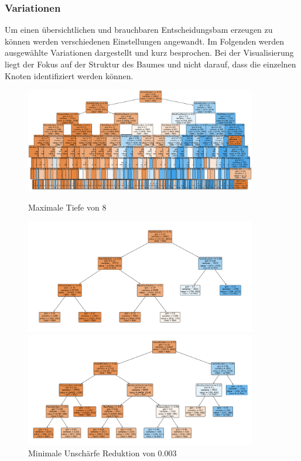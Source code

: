 \subsubsection{Variationen}
Um einen übersichtlichen und brauchbaren Entscheidungsbam erzeugen zu können werden verschiedenen Einstellungen angewandt. Im Folgenden werden ausgewählte Variationen dargestellt und kurz besprochen. Bei der Visualisierung liegt der Fokus auf der Struktur des Baumes und nicht darauf, dass die einzelnen Knoten identifiziert werden können.\\
\begin{figure}[H]
    \centering
     \begin{minipage}{0.30\textwidth}
        \centering
        \includegraphics[width=0.9\textwidth]{Bilder/treeMaxDepth8} %
        \caption{Maximale Tiefe von 8}
        \label{fig:treeMaxDepth}
    \end{minipage}\hfill
    \begin{minipage}{0.30\textwidth}
        \centering
        \includegraphics[width=0.9\textwidth]{Bilder/treeMinImpurityDecrease} %
        \caption{Minimale Unschärfe Reduktion von 0.003}
        \label{fig:treeMinImpurityDecrease}
    \end{minipage}\hfill
    \begin{minipage}{0.30\textwidth}
        \centering
        \includegraphics[width=0.9\textwidth]{Bilder/treeMaxLeafNodes} %

\end{minipage}
\end{figure}
